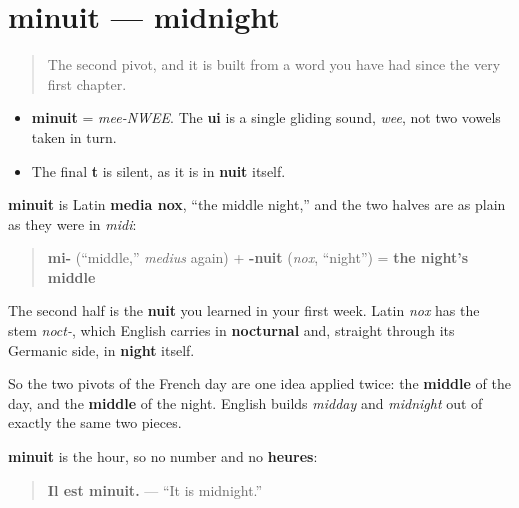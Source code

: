 \section[minuit]{minuit — midnight}

\label{lesson:FR-C08-minuit}



\begin{quote}
The second pivot, and it is built from a word you have had since the very first chapter.
\end{quote}

\begin{sounds}
\begin{itemize}
\raggedright
  \item \textbf{minuit} = \emph{mee-NWEE}. The \textbf{ui} is a single gliding sound, \emph{wee}, not two vowels taken in turn.
  \item The final \textbf{t} is silent, as it is in \textbf{nuit} itself.
\end{itemize}
\end{sounds}

\begin{cousinweb}
\textbf{minuit} is Latin \textbf{media nox}, \textquotedblleft{}the middle night,\textquotedblright{} and the two halves are as plain as they were in \emph{midi}:

\begin{quote}
\textbf{mi-} (\textquotedblleft{}middle,\textquotedblright{} \emph{medius} again) + \textbf{-nuit} (\emph{nox}, \textquotedblleft{}night\textquotedblright{}) = \textbf{the night's middle}
\end{quote}

The second half is the \textbf{nuit} you learned in your first week. Latin \emph{nox} has the stem \emph{noct-}, which English carries in \textbf{nocturnal} and, straight through its Germanic side, in \textbf{night} itself.

So the two pivots of the French day are one idea applied twice: the \textbf{middle} of the day, and the \textbf{middle} of the night. English builds \emph{midday} and \emph{midnight} out of exactly the same two pieces.
\end{cousinweb}

\begin{grammarlens}[title={Grammar Lens: the same rule as midi}]
\textbf{minuit} is the hour, so no number and no \textbf{heures}:

\begin{quote}
\textbf{Il est minuit.} — \textquotedblleft{}It is midnight.\textquotedblright{}
\end{quote}
\end{grammarlens}

